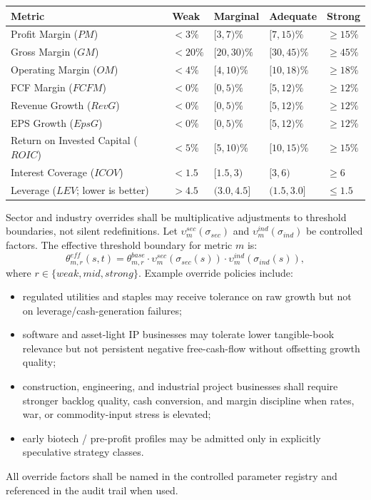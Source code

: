 \renewcommand{\arraystretch}{1.12}
\begin{longtable}{p{}p{}p{}p{}p{}}
\toprule
Metric & Weak & Marginal & Adequate & Strong \\
\midrule
Profit Margin ($PM$) & $<3\%$ & $[3,7)\%$ & $[7,15)\%$ & $\ge 15\%$ \\
Gross Margin ($GM$) & $<20\%$ & $[20,30)\%$ & $[30,45)\%$ & $\ge 45\%$ \\
Operating Margin ($OM$) & $<4\%$ & $[4,10)\%$ & $[10,18)\%$ & $\ge 18\%$ \\
FCF Margin ($FCFM$) & $<0\%$ & $[0,5)\%$ & $[5,12)\%$ & $\ge 12\%$ \\
Revenue Growth ($RevG$) & $<0\%$ & $[0,5)\%$ & $[5,12)\%$ & $\ge 12\%$ \\
EPS Growth ($EpsG$) & $<0\%$ & $[0,5)\%$ & $[5,12)\%$ & $\ge 12\%$ \\
Return on Invested Capital ($ROIC$) & $<5\%$ & $[5,10)\%$ & $[10,15)\%$ & $\ge 15\%$ \\
Interest Coverage ($ICOV$) & $<1.5$ & $[1.5,3)$ & $[3,6)$ & $\ge 6$ \\
Leverage ($LEV$; lower is better) & $>4.5$ & $(3.0,4.5]$ & $(1.5,3.0]$ & $\le 1.5$ \\
\bottomrule
\end{longtable}

Sector and industry overrides shall be multiplicative adjustments to threshold boundaries, not silent redefinitions. Let $\upsilon_m^{sec}(\sigma_{sec})$ and $\upsilon_m^{ind}(\sigma_{ind})$ be controlled factors. The effective threshold boundary for metric $m$ is:
\[
\theta^{eff}_{m,r}(s,t)=\theta_{m,r}^{base}\cdot \upsilon_m^{sec}(\sigma_{sec}(s))\cdot \upsilon_m^{ind}(\sigma_{ind}(s)),
\]
where $r\in\{weak,mid,strong\}$. Example override policies include:
\begin{itemize}
    \item regulated utilities and staples may receive tolerance on raw growth but not on leverage/cash-generation failures;
    \item software and asset-light IP businesses may tolerate lower tangible-book relevance but not persistent negative free-cash-flow without offsetting growth quality;
    \item construction, engineering, and industrial project businesses shall require stronger backlog quality, cash conversion, and margin discipline when rates, war, or commodity-input stress is elevated;
    \item early biotech / pre-profit profiles may be admitted only in explicitly speculative strategy classes.
\end{itemize}
All override factors shall be named in the controlled parameter registry and referenced in the audit trail when used.

